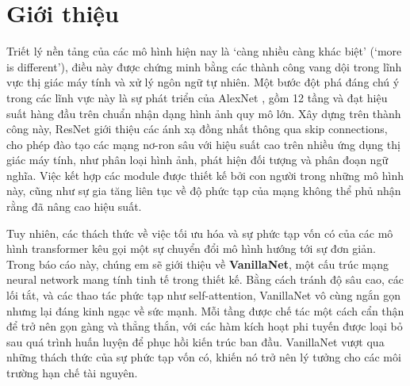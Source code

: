 \documentclass[a4paper,12pt]{article}
\begin{document}
\newpage
\section{Giới thiệu}
Triết lý nền tảng của các mô hình hiện nay là `càng nhiều càng khác biệt' (`more is different'), điều này được chứng minh bằng các thành công vang dội trong lĩnh vực thị giác máy tính và xử lý ngôn ngữ tự nhiên. Một bước đột phá đáng chú ý trong các lĩnh vực này là sự phát triển của AlexNet \cite{NIPS2012_c399862d}, gồm 12 tầng và đạt hiệu suất hàng đầu trên chuẩn nhận dạng hình ảnh quy mô lớn. Xây dựng trên thành công này, ResNet \cite{he2015deepresiduallearningimage} giới thiệu các ánh xạ đồng nhất thông qua skip connections, cho phép đào tạo các mạng nơ-ron sâu với hiệu suất cao trên nhiều ứng dụng thị giác máy tính, như phân loại hình ảnh, phát hiện đối tượng và phân đoạn ngữ nghĩa. Việc kết hợp các module được thiết kế bởi con người trong những mô hình này, cũng như sự gia tăng liên tục về độ phức tạp của mạng không thể phủ nhận rằng đã nâng cao hiệu suất. 

Tuy nhiên, các thách thức về việc tối ưu hóa và sự phức tạp vốn có của các mô hình transformer kêu gọi một sự chuyển đổi mô hình hướng tới sự đơn giản. Trong báo cáo này, chúng em sẽ giới thiệu về \textbf{VanillaNet}, một cấu trúc mạng neural network mang tính tinh tế trong thiết kế. Bằng cách tránh độ sâu cao, các lối tắt, và các thao tác phức tạp như self-attention, VanillaNet vô cùng ngắn gọn nhưng lại đáng kinh ngạc về sức mạnh. Mỗi tầng được chế tác một cách cẩn thận để trở nên gọn gàng và thẳng thắn, với các hàm kích hoạt phi tuyến được loại bỏ sau quá trình huấn luyện để phục hồi kiến trúc ban đầu. VanillaNet vượt qua những thách thức của sự phức tạp vốn có, khiến nó trở nên lý tưởng cho các môi trường hạn chế tài nguyên.
\end{document}

